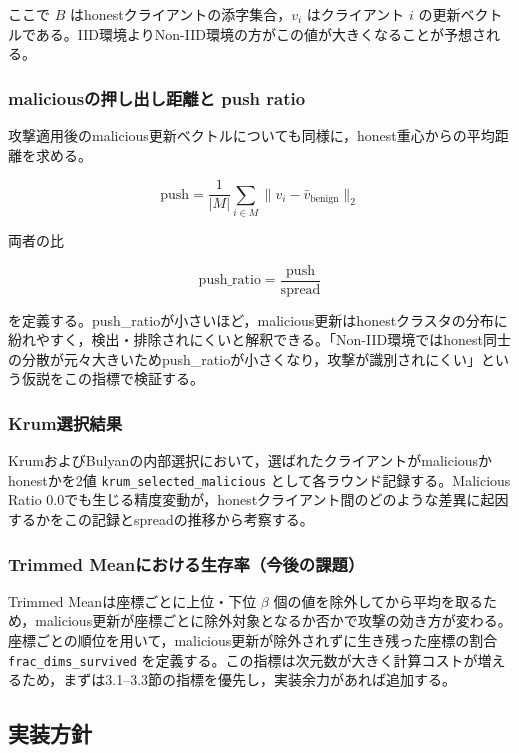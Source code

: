 \documentclass[a4j, twocolumn, dvipdfmx]{jsarticle}  %
\begin{document}
ここで $B$ はhonestクライアントの添字集合，$v_i$ はクライアント $i$ の更新ベクトルである。IID環境よりNon-IID環境の方がこの値が大きくなることが予想される。

\subsubsection{maliciousの押し出し距離と push ratio}

攻撃適用後のmalicious更新ベクトルについても同様に，honest重心からの平均距離を求める。

\begin{equation}
\text{push} = \frac{1}{|M|}\sum_{i \in M} \|v_i - \bar{v}_{\text{benign}}\|_2
\end{equation}

両者の比

\begin{equation}
\text{push\_ratio} = \frac{\text{push}}{\text{spread}}
\end{equation}

を定義する。push\_ratioが小さいほど，malicious更新はhonestクラスタの分布に紛れやすく，検出・排除されにくいと解釈できる。「Non-IID環境ではhonest同士の分散が元々大きいためpush\_ratioが小さくなり，攻撃が識別されにくい」という仮説をこの指標で検証する。

\subsubsection{Krum選択結果}

KrumおよびBulyanの内部選択において，選ばれたクライアントがmaliciousかhonestかを2値 \texttt{krum\_selected\_malicious} として各ラウンド記録する。Malicious Ratio 0.0でも生じる精度変動が，honestクライアント間のどのような差異に起因するかをこの記録とspreadの推移から考察する。

\subsubsection{Trimmed Meanにおける生存率（今後の課題）}

Trimmed Meanは座標ごとに上位・下位 $\beta$ 個の値を除外してから平均を取るため，malicious更新が座標ごとに除外対象となるか否かで攻撃の効き方が変わる。座標ごとの順位を用いて，malicious更新が除外されずに生き残った座標の割合 \texttt{frac\_dims\_survived} を定義する。この指標は次元数が大きく計算コストが増えるため，まずは3.1--3.3節の指標を優先し，実装余力があれば追加する。

\subsection{実装方針}
\end{document}
